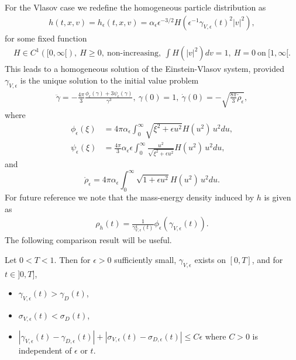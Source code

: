 \documentclass[11pt]{article}
\begin{document}
For the Vlasov case we redefine the homogeneous particle distribution as
\begin{align}\label{hepsdef}
  h(t,x,v) = h_{\epsilon} (t,x,v)
  = \alpha_\epsilon \epsilon^{-3/2} H(\epsilon^{-1}\gamma_{V,\epsilon}(t)^2 |v|^2),
\end{align}
for some fixed function
\begin{align}\label{Hdef}
  H\in C^1([0,\infty[),\ H\geq 0,\ \mbox{non-increasing},\ 
  \!\int\!\! H(|v|^2) dv = 1,\ H=0\ \mbox{on}\ [1,\infty[.
\end{align}
This leads to a
homogeneous solution of the Einstein-Vlasov system, provided
$\gamma_{V,\epsilon}$ is the unique solution to
the initial value problem
\begin{align} \label{gammaeq_vl_eps}
  \ddot \gamma = -\frac{4\pi}{3}
  \frac{\phi_{\epsilon}(\gamma) +
    3 \psi_{\epsilon}(\gamma)}{\gamma^3},\
  \gamma(0)=1,\ \dot \gamma(0) = - \sqrt{\frac{8\pi}{3} \mathring\rho_{\epsilon}},
\end{align}
where
\begin{align}
\phi_{\epsilon}(\xi)
&=
4\pi \alpha_\epsilon \int_0^\infty \sqrt{\xi^2 + \epsilon u^2} H(u^2)\, u^2 du,
\label{phi_eps}\\
\psi_{\epsilon}(\xi)
&=
\frac{4\pi}{3} \alpha_\epsilon \epsilon
\int_0^\infty \frac{u^2}{\sqrt{\xi^2 + \epsilon u^2}} H(u^2)\, u^2 du,
\label{psi_eps}
\end{align}
and
\[
\mathring\rho_{\epsilon} =
4\pi \alpha_\epsilon \int_0^\infty \sqrt{1 + \epsilon u^2} H(u^2)\, u^2 du.
\]
For future reference we note that the mass-energy density
induced by $h$ is given as
\begin{align}\label{rho_h}
  \rho_h(t)=\frac{1}{\gamma^4_{V,\epsilon}(t)}\phi_\epsilon(\gamma_{V,\epsilon}(t)).
\end{align}
The following comparison result will be useful.
%
\begin{lemma}\label{gamma_comp}
  Let $0<T<1$. Then for $\epsilon>0$ sufficiently small,
  $\gamma_{V,\epsilon}$ exists on $[0,T]$, and for $t\in ]0,T]$,
  \begin{itemize}
    \item[(a)]
      $\gamma_{V,\epsilon}(t) > \gamma_D(t)$,
    \item[(b)]
      $\sigma_{V,\epsilon}(t) < \sigma_D(t)$,
    \item[(c)]
      $|\gamma_{V,\epsilon}(t) - \gamma_{D,\epsilon}(t)| +
      |\sigma_{V,\epsilon}(t) - \sigma_{D,\epsilon}(t)|\leq C \epsilon$
      where $C>0$ is independent of $\epsilon$ or $t$.
  \end{itemize}
\end{lemma}
\end{document}
